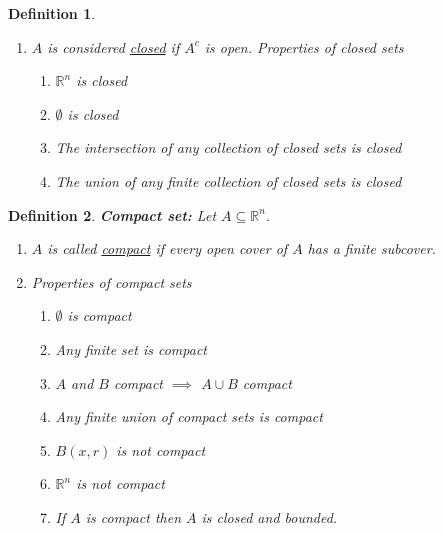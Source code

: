 \documentclass[]{article}
\newcommand{\R}{\mathbb{R}}
\newtheorem{definition}{Definition}
\begin{document}
\begin{definition}
\begin{enumerate}
\[            \partial A := \overline{A} \backslash A^\circ
        \] \item $A$ is considered \emph{\underline{closed}} if $A^c$ is open. 
        Properties of closed sets \begin{enumerate}
            \item $\R^n$ is closed
            \item $\emptyset$ is closed
            \item The intersection of any collection of closed sets is closed
            \item The union of any finite collection of closed sets is closed
        \end{enumerate}
    \end{enumerate}
\end{definition}

\begin{definition}
    \emph{\textbf{Compact set:}} 
    Let $A \subseteq \R^n$. 
    \begin{enumerate}
        \item $A$ is called \emph{\underline{compact}} if every open cover of $A$ has a finite subcover.
        \item Properties of compact sets \begin{enumerate}
            \item $\emptyset$ is compact
            \item Any finite set is compact
            \item $A$ and $B$ compact $\implies$ $A \cup B$ compact
            \item Any finite union of compact sets is compact
            \item $B(x,r)$ is not compact
            \item $\R^n$ is not compact
            \item If $A$ is compact then $A$ is closed and bounded.
        \end{enumerate}
    \end{enumerate}
\end{definition}
\end{document}
